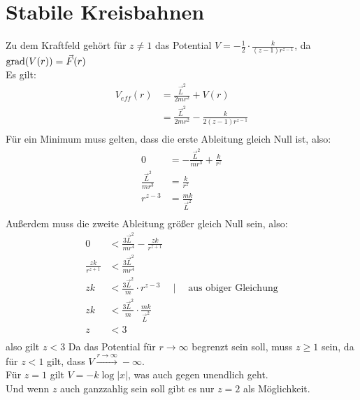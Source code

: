 \documentclass[sectionformat = aufgabe]{gadsescript}
\begin{document}
\section{Stabile Kreisbahnen}
Zu dem Kraftfeld gehört für $ z \neq 1 $ das Potential $ V = - \frac{ 1 }{ 2 } \cdot \frac{ k }{ (z - 1) r^{z - 1}  } $, da $ \operatorname{grad}(V(r)) = \vec F(r) $ \\
Es gilt:
\begin{align*}
	V_{eff}(r) &= \frac{ \vec L^2 }{ 2mr^2 } + V(r) \\
	~&= \frac{ \vec L^2 }{ 2mr^2 } - \frac{ k }{ 2(z - 1 ) r^{z-1} } \\
\end{align*}
Für ein Minimum muss gelten, dass die erste Ableitung gleich Null ist, also:
\begin{align*}
	0 &= - \frac{ \vec L^2 }{ mr^3 } + \frac{ k }{ r^{z} } \\
	\frac{ \vec L^2 }{ mr^3 } &= \frac{ k }{ r^z }  \\
	r^{z-3} &= \frac{ mk }{ \vec L^2 } \\
\end{align*}
Außerdem muss die zweite Ableitung größer gleich Null sein, also:
\begin{align*}
	0 &< \frac{ 3\vec L^2 }{ mr^4 } - \frac{ zk }{ r^{z + 1 } } \\
	\frac{ zk }{ r^{z + 1}  } &< \frac{ 3 \vec L^2 }{ mr^4 } \\
	zk &< \frac{3 \vec L^2 }{ m } \cdot r^{z - 3} \quad \mid \quad \text{aus obiger Gleichung}  \\
	zk &< \frac{3 \vec L^2 }{ m } \cdot \frac{ mk }{ \vec L^2 } \\
	z &< 3 \\
\end{align*}
also gilt $ z < 3 $
Da das Potential für $ r \to \infty $ begrenzt sein soll, muss $ z \geq 1 $ sein, da für $ z < 1 $ gilt, dass $ V \overset{r \to \infty}{\to } - \infty $.\\
Für $ z = 1 $ gilt $ V = - k \log \left| x \right| $, was auch gegen unendlich geht.\\
Und wenn $ z $ auch ganzzahlig sein soll gibt es nur $ z = 2 $ als Möglichkeit.
\end{document}
